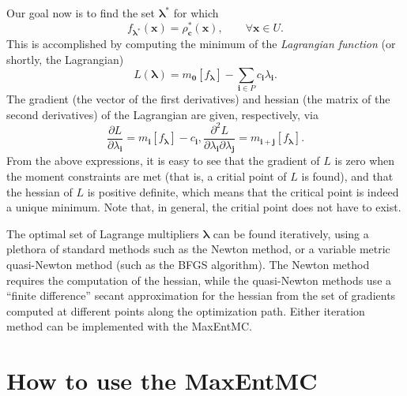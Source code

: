 \documentclass[12pt]{amsart}
\numberwithin{equation}{section}
\newcommand\BS{\boldsymbol}
\newcommand\parderiv[2]{\frac{\partial #1}{\partial #2}}
\begin{document}
Our goal now is to find the set $\BS\lambda^*$ for which
%
\begin{equation}
f_{\BS\lambda^*}(\BS x)=\rho_{\BS c}^*(\BS x), \qquad\forall\BS x\in
U.
\end{equation}
%
This is accomplished by computing the minimum of the {\em Lagrangian
  function} (or shortly, the Lagrangian)
%
\begin{equation}
\label{eq:lagrangian}
L(\BS\lambda)=m_{\BS 0}[f_{\BS\lambda}]-\sum_{\BS i\in
  P}c_{\BS i}\lambda_{\BS i}.
\end{equation}
%
The gradient (the vector of the first derivatives) and hessian (the
matrix of the second derivatives) of the Lagrangian are given,
respectively, via
%
\begin{subequations}
\begin{equation}
\parderiv L{\lambda_{\BS i}}=m_{\BS i}[f_{\BS\lambda}]-c_{\BS i},
\end{equation}
\begin{equation}
\parderiv{^2 L}{\lambda_{\BS i}\partial\lambda_{\BS j}}=m_{\BS i+\BS
  j}[f_{\BS\lambda}].
\end{equation}
\end{subequations}
%
From the above expressions, it is easy to see that the gradient of $L$
is zero when the moment constraints are met (that is, a critial point
of $L$ is found), and that the hessian of $L$ is positive definite,
which means that the critical point is indeed a unique minimum. Note
that, in general, the critial point does not have to exist.

The optimal set of Lagrange multipliers $\BS\lambda$ can be found
iteratively, using a plethora of standard methods such as the Newton
method, or a variable metric quasi-Newton method (such as the BFGS
algorithm). The Newton method requires the computation of the hessian,
while the quasi-Newton methods use a ``finite difference'' secant
approximation for the hessian from the set of gradients computed at
different points along the optimization path. Either iteration method
can be implemented with the MaxEntMC.

\section{How to use the MaxEntMC}
\end{document}
